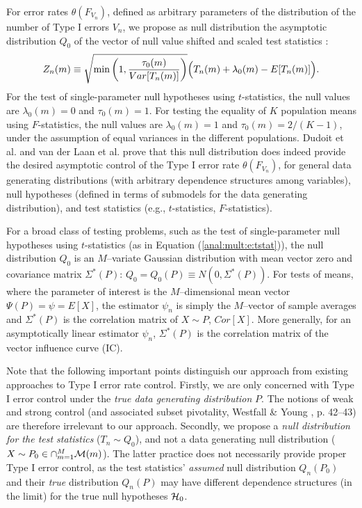 \documentclass[11pt]{article}
\begin{document}
For error rates $\theta(F_{V_n})$, defined as arbitrary parameters of the distribution of the number of Type I errors $V_n$, we propose as null distribution the asymptotic distribution $Q_0$ of the vector of null value shifted and scaled test statistics \cite{Dudoit&vdLaanMTBook,DudoitetalMT1SAGMB04,vdLaanetalMT2SAGMB04,vdLaanetalMT3SAGMB04,Pollard&vdLaanJSPI04}:
\begin{equation}
Z_n(m) \equiv 
 \sqrt{\min \left(1,
  \frac{\tau_0(m)}{Var[T_n(m)]}\right)} \Bigl( T_n(m) + \lambda_0(m) - E[T_n(m)] \Bigr).
\end{equation}
For the test of single-parameter null hypotheses using $t$-statistics, the null values are $\lambda_0(m)=0$ and $\tau_0(m)=1$. For testing the equality of $K$ population means using $F$-statistics, the null values are  $\lambda_0(m)= 1$ and $\tau_0(m) = 2/(K-1)$, under the assumption of equal variances in the different populations.
Dudoit et al. \cite{DudoitetalMT1SAGMB04} and van der Laan et al. \cite{vdLaanetalMT2SAGMB04} prove that this null distribution does indeed provide the desired asymptotic control of the Type I error rate $\theta(F_{V_n})$, for
 general data generating distributions (with arbitrary dependence structures among variables), null hypotheses (defined in terms of submodels for the data generating distribution), and test statistics (e.g., $t$-statistics, $F$-statistics).

For a broad class of testing problems, such as the test of single-parameter null hypotheses using $t$-statistics (as in Equation (\ref{anal:mult:e:tstat})), the null distribution $Q_0$ is an $M$--variate Gaussian distribution with mean vector zero and covariance matrix $\Sigma^*(P)$: $Q_0 = Q_0(P) \equiv N(0,\Sigma^*(P))$. 
For tests of means, where the parameter of interest is the $M$--dimensional mean vector $\Psi(P) = \psi = E[X]$, the estimator $\psi_n$ is simply the $M$--vector of sample averages and $\Sigma^*(P)$ is the correlation matrix of $X \sim P$, $Cor[X]$. More generally, for an asymptotically linear estimator $\psi_n$, $\Sigma^*(P)$ is the correlation matrix of the vector influence curve (IC).

Note that the following important points distinguish our approach from existing approaches to Type I error rate control. 
Firstly, we are only concerned with Type I error control under the {\em true data generating distribution} $P$. The notions of weak and strong control (and associated subset pivotality, Westfall \& Young \cite{Westfall&Young93},
p. 42--43) are therefore irrelevant to our approach. 
Secondly, we propose a {\em null distribution for the test statistics} ($T_n \sim Q_0$), and not a data generating null distribution ($X \sim P_0\in \cap_{m=1}^M {\cal M}(m)$). 
The latter practice does not necessarily provide proper Type I error control, as the test statistics' {\em assumed} null distribution $Q_n(P_0)$ and their {\em true} distribution $Q_n(P)$ may have different dependence structures (in the limit) for the true null hypotheses ${\cal H}_0$.\\
\end{document}
